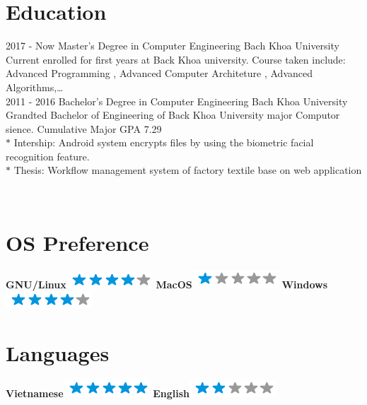 \documentclass[]{friggeri-cv}
\begin{document}
\section{Education}
\begin{entrylist}
  \entry
    {2017 - Now}
    {Master's Degree in Computer Engineering}
    {Bach Khoa University}
    {Current enrolled for first years at Back Khoa university. Course taken include: 
Advanced Programming , Advanced Computer Architeture , Advanced Algorithms,…\\}
  \entry
    {2011 - 2016}
    {Bachelor's Degree in Computer Engineering}
    {Bach Khoa University}
    {Grandted Bachelor of Engineering of Back Khoa University major Computor sience. Cumulative Major GPA 7.29\\
       $*$ Intership: Android system encrypts files by using the biometric facial recognition feature.\\
       $*$ Thesis: 	Workflow management system of factory textile base on web application\\}
\end{entrylist}


\begin{aside}
~
~
~
  \section{OS Preference}
    \textbf{GNU/Linux}\includegraphics[scale=0.40]{img/4stars.png}
    \textbf{MacOS}\includegraphics[scale=0.40]{img/1stars.png}
    \textbf{Windows}\includegraphics[scale=0.40]{img/4stars.png}
  \section{Languages}
    \textbf{Vietnamese}\includegraphics[scale=0.40]{img/5stars.png}
    \textbf{English}\includegraphics[scale=0.40]{img/2stars.png}
    ~
\end{aside}
\end{document}
